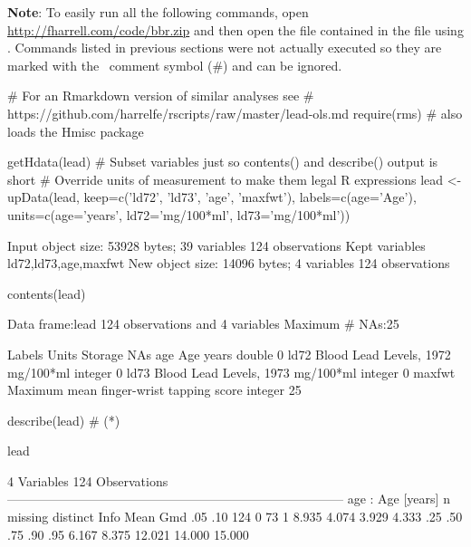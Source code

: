 \textbf{Note}: To easily run all the following commands, open \ipacue
\url{http://fharrell.com/code/bbr.zip}
and then open the file  contained in the 
file using .  Commands listed in previous sections were
not actually executed so they are marked with the \R\ comment symbol
(\#) and can be ignored.

\begin{Schunk}
\begin{Sinput}
# For an Rmarkdown version of similar analyses see
# https://github.com/harrelfe/rscripts/raw/master/lead-ols.md
require(rms)    # also loads the Hmisc package
\end{Sinput}
\begin{Sinput}
getHdata(lead)
# Subset variables just so contents() and describe() output is short
# Override units of measurement to make them legal R expressions
lead <- upData(lead,
               keep=c('ld72', 'ld73', 'age', 'maxfwt'),
               labels=c(age='Age'),
               units=c(age='years', ld72='mg/100*ml', ld73='mg/100*ml'))
\end{Sinput}
\begin{Soutput}
Input object size:	 53928 bytes;	 39 variables	 124 observations
Kept variables	ld72,ld73,age,maxfwt
New object size:	14096 bytes;	4 variables	124 observations
\end{Soutput}
\begin{Sinput}
contents(lead)
\end{Sinput}
\begin{Soutput}

Data frame:lead	124 observations and 4 variables    Maximum # NAs:25


                                        Labels     Units Storage NAs
age                                        Age     years  double   0
ld72                   Blood Lead Levels, 1972 mg/100*ml integer   0
ld73                   Blood Lead Levels, 1973 mg/100*ml integer   0
maxfwt Maximum mean finger-wrist tapping score           integer  25
\end{Soutput}
\begin{Sinput}
describe(lead)   # (*\ipacue*)
\end{Sinput}
\begin{Soutput}
lead 

 4  Variables      124  Observations
--------------------------------------------------------------------------------
age : Age [years] 
       n  missing distinct     Info     Mean      Gmd      .05      .10 
     124        0       73        1    8.935    4.074    3.929    4.333 
     .25      .50      .75      .90      .95 
   6.167    8.375   12.021   14.000   15.000 


\end{Soutput}
\end{Schunk}
